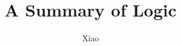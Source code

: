\documentclass[12pt,a4paper]{report}
\theoremstyle{definition}
\theoremstyle{plain}
\theoremstyle{case}
\theoremstyle{remark}
\begin{document}
\title{A Summary of Logic}
\author{Xiao}
\date{}
\maketitle

\tableofcontents










\appendix




\end{document}
